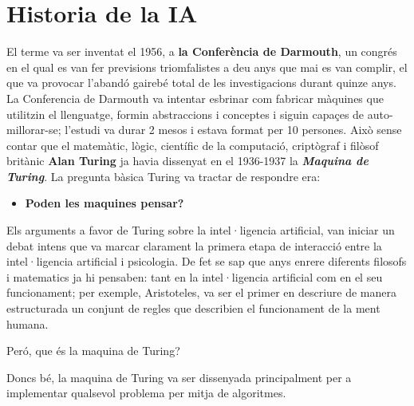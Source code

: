 \section {Historia de la IA}

El terme va ser inventat el 1956, a \textbf{la Conferència de Darmouth}, un congrés en el qual es van fer previsions triomfalistes a deu anys que mai es van complir, el que va provocar l'abandó gairebé total de les investigacions durant quinze anys. La Conferencia de Darmouth va intentar esbrinar com fabricar màquines que utilitzin el llenguatge, formin abstraccions i conceptes i siguin capaçes de auto-millorar-se; l'estudi va durar 2 mesos i estava format per 10 persones. Això sense contar que el matemàtic, lògic, científic de la computació, criptògraf  i filòsof britànic \textbf{Alan Turing} ja havia dissenyat en el 1936-1937 la \textbf{\emph{Maquina de Turing}}. La pregunta bàsica Turing va tractar de respondre era:
\begin{itemize} 
\item \textbf{Poden les maquines pensar?}
\end{itemize}
Els arguments a favor de Turing sobre la intel·ligencia artificial, van iniciar un debat intens que va marcar clarament la primera etapa de interacció entre la intel·ligencia artificial i psicologia. De fet se sap que anys enrere diferents filosofs i matematics ja hi pensaben: tant en la intel·ligencia artificial com en el seu funcionament; per exemple, Aristoteles, va ser el primer en descriure de manera estructurada un conjunt de regles que describien el funcionament de la ment humana.

Peró, que és la maquina de Turing?

Doncs bé, la maquina de Turing va ser dissenyada principalment per a implementar qualsevol problema per mitja de algoritmes.\cite {algoritme cite}

